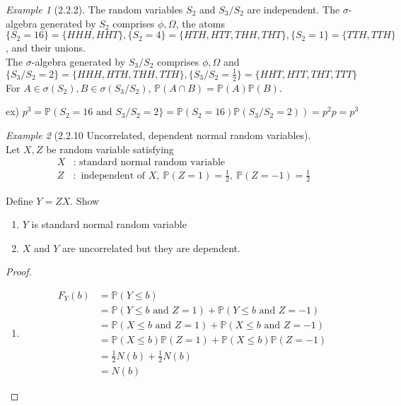 \documentclass[12pt]{report}
\renewcommand{\1}{\mathbb{1}}
\theoremstyle{break}
\theoremstyle{newdef}
\theoremstyle{remark}
\newtheorem*{exmp}{Example} %
\begin{document}
\begin{appendices}
\begin{exmp}[2.2.2]
The random variables $S_2$ and $S_3/S_2$ are independent.
The $\sigma$-algebra generated by $S_2$ comprises $\phi, \Omega$, the atoms\\
$\{S_2 = 16\} = \{ HHH, HHT\}
, \{S_2=  4\} = \{ HTH, HTT, THH, THT\}
, \{S_2 = 1\} = \{TTH, TTH\}$, and their unions.\\

The $\sigma$-algebra generated by $S_3/S_2$ comprises $\phi, \Omega$ and\\
$\{S_3/S_2 = 2\} = \{HHH, HTH, THH, TTH\}
, \{S_3/S_2 = \frac{1}{2} \} = \{ HHT, HTT, THT, TTT\}$\\

For $A \in \sigma(S_2), B \in \sigma(S_3/S_2)$,
$\mathbb{P}(A \cap B) = \mathbb{P}(A)\mathbb{P}(B)$.

ex) $p^3 = \mathbb{P}(S_2 = 16 \text{ and } S_3/S_2 = 2\} = \mathbb{P}(S_2 = 16)\mathbb{P}(S_3/S_2 = 2)) = p^2 p = p^3$

\end{exmp}

\vspace{5mm}

\begin{exmp}[2.2.10 Uncorrelated, dependent normal random variables]
\leavevmode\\
Let $X, Z$ be random variable satisfying
$$
\begin{aligned}
X&: \text{ standard normal random variable}\\
Z&: \text{ independent of } X,\ \mathbb{P}(Z = 1) = \frac{1}{2},\ \mathbb{P}(Z = -1) = \frac{1}{2}
\end{aligned}
$$

Define $Y = ZX$.
Show
\begin{enumerate}
\item $Y$ is standard normal random variable
\item $X$ and $Y$ are uncorrelated but they are dependent.
\end{enumerate}


\begin{proof}
\leavevmode
\begin{enumerate}
\item
$$
\begin{aligned}
F_Y(b) &= \mathbb{P}(Y \leq b)\\
&= \mathbb{P}(Y \leq b \text{ and } Z = 1)
+ \mathbb{P}(Y \leq b \text{ and } Z = -1)\\
&= \mathbb{P}(X \leq b \text{ and } Z = 1)
+ \mathbb{P}(X \leq b \text{ and } Z = -1)\\
&= \mathbb{P}(X \leq b)\mathbb{P}(Z=1)
+ \mathbb{P}(X \leq b)\mathbb{P}(Z=-1)\\
&= \frac{1}{2}N(b) + \frac{1}{2}N(b)\\
&=N(b)
\end{aligned}
$$


\end{enumerate}
\end{proof}
\end{exmp}
\end{appendices}
\end{document}
